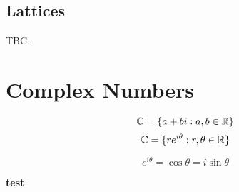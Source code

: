 \documentclass[openany]{report}
\begin{document}
\subsection{Lattices}
TBC.
\begin{center}
    \textbf{}
\end{center}
\section{Complex Numbers}
$$\mathbb{C} = \{a + bi : a,b \in \mathbb{R}\}$$
$$\mathbb{C} = \{re^{i\theta} : r, \theta \in \mathbb{R}\}$$
\begin{lemma}
    $$e^{i\theta} = \cos\theta = i\sin\theta$$
\end{lemma}
\textbf{test}
\end{document}
